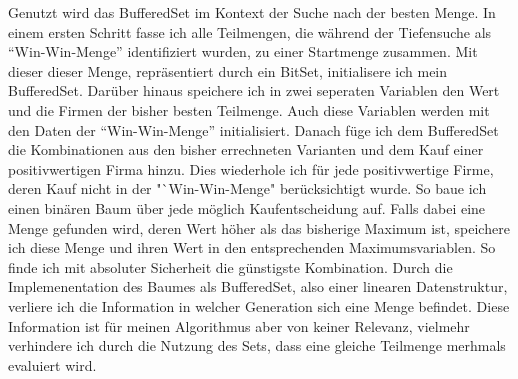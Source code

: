 Genutzt wird das BufferedSet im Kontext der Suche nach der besten Menge. In einem ersten Schritt fasse ich alle Teilmengen, die während der Tiefensuche als "`Win-Win-Menge"' identifiziert wurden, zu einer Startmenge zusammen. Mit dieser dieser Menge, repräsentiert durch ein BitSet, initialisere ich mein BufferedSet. Darüber hinaus speichere ich in zwei seperaten Variablen den Wert und die Firmen der bisher besten Teilmenge. Auch diese Variablen werden mit den Daten der "`Win-Win-Menge"' initialisiert. 
Danach füge ich dem BufferedSet die Kombinationen aus den bisher errechneten Varianten und dem Kauf einer positivwertigen Firma hinzu. Dies wiederhole ich für jede positivwertige Firme, deren Kauf nicht in der "`Win-Win-Menge" berücksichtigt wurde. So baue ich einen binären Baum über jede möglich Kaufentscheidung auf. Falls dabei eine Menge gefunden wird, deren Wert höher als das bisherige Maximum ist, speichere ich diese Menge und ihren Wert in den entsprechenden Maximumsvariablen. So finde ich mit absoluter Sicherheit die günstigste Kombination. Durch die Implemenentation des Baumes als BufferedSet, also einer linearen Datenstruktur, verliere ich die Information in welcher Generation sich eine Menge befindet. Diese Information ist für meinen Algorithmus aber von keiner Relevanz, vielmehr verhindere ich durch die Nutzung des Sets, dass eine gleiche Teilmenge merhmals evaluiert wird.